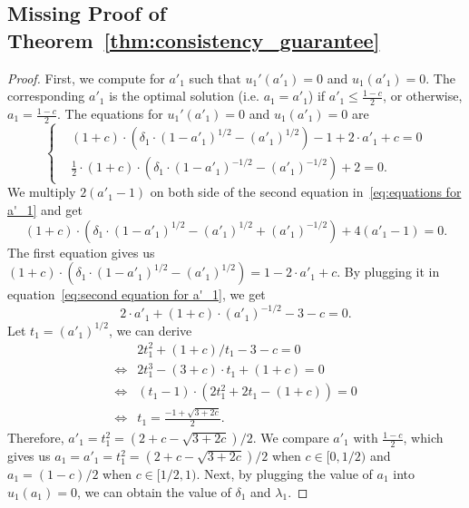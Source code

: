 \subsection{Missing Proof of Theorem~\ref{thm:consistency_guarantee}}
\begin{proof}
First, we compute for $a'_1$ such that $u_1'(a'_1)=0$ and $u_1(a'_1)=0$. The corresponding $a'_1$ is the optimal solution (i.e. $a_1=a'_1$) if $a'_1\leq \frac{1-c}{2}$, or otherwise, $a_1=\frac{1-c}{2}$. The equations for $u_1'(a'_1)=0$ and $u_1(a'_1)=0$ are
\begin{equation}
\label{eq:equations for a'_1}
\left\{
    \begin{aligned}
    &\left(1+c\right)\cdot\left(\delta_1\cdot(1-a'_1)^{1/2}-{(a'_1)}^{1/2}\right)-1+2\cdot a'_1+c=0\\
    &\frac{1}{2}\cdot\left(1+c\right)\cdot\left(\delta_1\cdot(1-a'_1)^{-1/2}-(a'_1)^{-1/2}\right)+2=0.
    \end{aligned}
    \right.
\end{equation}
We multiply $2(a'_1-1)$ on both side of the second equation in~\eqref{eq:equations for a'_1} and get
\begin{equation}
\label{eq:second equation for a'_1}
    \left(1+c\right)\cdot\left(\delta_1\cdot(1-a'_1)^{1/2}-(a'_1)^{1/2}+(a'_1)^{-1/2}\right)+4(a'_1-1)=0.
\end{equation}
The first equation gives us $(1+c)\cdot(\delta_1\cdot(1-a'_1)^{1/2}-(a'_1)^{1/2})=1-2\cdot a'_1+c$. By plugging it in equation~\eqref{eq:second equation for a'_1}, we get
\begin{equation}
\label{eq:third equation for a'_1}
    2\cdot a'_1+(1+c)\cdot (a'_1)^{-1/2}-3-c=0.
\end{equation}
Let $t_1=(a'_1)^{1/2}$, we can derive
\begin{align*}
&2t_1^2+(1+c)/ t_1-3-c=0\\
\Leftrightarrow& 2t_1^3-(3+c)\cdot t_1 +(1+c)=0\\
\Leftrightarrow& (t_1-1)\cdot\left(2t_1^2+2t_1-(1+c)\right)=0\\
\Leftrightarrow& t_1 = \frac{-1+\sqrt{3+2c}}{2}.
\end{align*}
Therefore, $a'_1=t_1^2=(2+c-\sqrt{3+2c})/2$. We compare $a'_1$ with $\frac{1-c}{2}$, which gives us $a_1=a'_1=t_1^2=(2+c-\sqrt{3+2c})/2$ when $c\in[0,1/2)$ and $a_1=(1-c)/2$ when $c\in[1/2,1)$. Next, by plugging the value of $a_1$ into $u_1(a_1)=0$, we can obtain the value of $\delta_1$ and $\lambda_1$. 


\end{proof}
